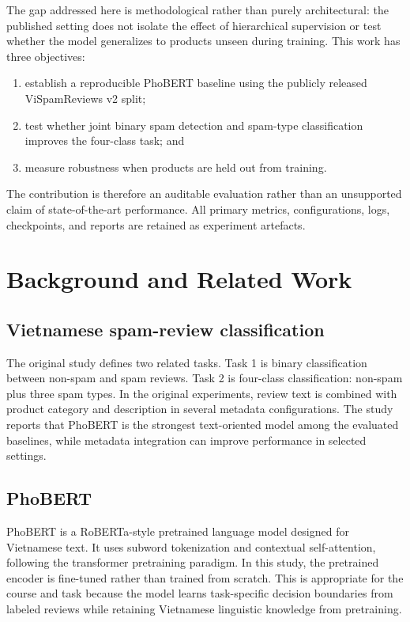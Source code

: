 \documentclass[runningheads]{llncs}
\begin{document}
The gap addressed here is methodological rather than purely architectural: the published setting does not isolate the effect of hierarchical supervision or test whether the model generalizes to products unseen during training. This work has three objectives:
\begin{enumerate}[leftmargin=*]
    \item establish a reproducible PhoBERT baseline using the publicly released ViSpamReviews v2 split;
    \item test whether joint binary spam detection and spam-type classification improves the four-class task; and
    \item measure robustness when products are held out from training.
\end{enumerate}

The contribution is therefore an auditable evaluation rather than an unsupported claim of state-of-the-art performance. All primary metrics, configurations, logs, checkpoints, and reports are retained as experiment artefacts.

\section{Background and Related Work}
\subsection{Vietnamese spam-review classification}
The original study defines two related tasks. Task 1 is binary classification between non-spam and spam reviews. Task 2 is four-class classification: non-spam plus three spam types. In the original experiments, review text is combined with product category and description in several metadata configurations. The study reports that PhoBERT is the strongest text-oriented model among the evaluated baselines, while metadata integration can improve performance in selected settings\cite{originalpaper}.

\subsection{PhoBERT}
PhoBERT is a RoBERTa-style pretrained language model designed for Vietnamese text\cite{phobert}. It uses subword tokenization and contextual self-attention, following the transformer pretraining paradigm\cite{bert}. In this study, the pretrained encoder is fine-tuned rather than trained from scratch. This is appropriate for the course and task because the model learns task-specific decision boundaries from labeled reviews while retaining Vietnamese linguistic knowledge from pretraining.
\end{document}
